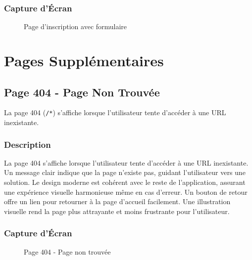 \documentclass[12pt,a4paper]{article}
\begin{document}
\subsubsection{Capture d'Écran}

\begin{figure}[H]
    \centering
    \caption{Page d'inscription avec formulaire}
    \label{fig:signup}
\end{figure}

\newpage

\section{Pages Supplémentaires}

\subsection{Page 404 - Page Non Trouvée}

La page 404 (\texttt{/*}) s'affiche lorsque l'utilisateur tente d'accéder à une URL inexistante.

\subsubsection{Description}

La page 404 s'affiche lorsque l'utilisateur tente d'accéder à une URL inexistante. Un message clair indique que la page n'existe pas, guidant l'utilisateur vers une solution. Le design moderne est cohérent avec le reste de l'application, assurant une expérience visuelle harmonieuse même en cas d'erreur. Un bouton de retour offre un lien pour retourner à la page d'accueil facilement. Une illustration visuelle rend la page plus attrayante et moins frustrante pour l'utilisateur.

\subsubsection{Capture d'Écran}

\begin{figure}[H]
    \centering
    \caption{Page 404 - Page non trouvée}
    \label{fig:404}
\end{figure}
\end{document}
